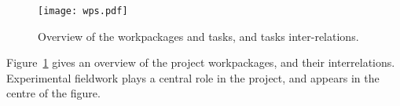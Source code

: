 \begin{figure}[h!]
\centering
\texttt{[image: wps.pdf]}
\caption{Overview of the workpackages and tasks, and tasks inter-relations.}
\label{fig:wps}
\end{figure}





Figure~\ref{fig:wps} gives an overview of the project
workpackages, and their interrelations. Experimental fieldwork plays a central role in the
project, and appears in the centre of the figure.

